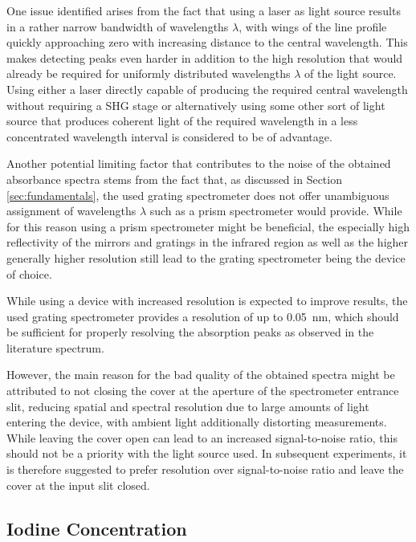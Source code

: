 One issue identified arises from the fact that using a laser as light source results in a rather narrow bandwidth of wavelengths $\lambda$, with wings of the line profile quickly approaching zero with increasing distance to the central wavelength. This makes detecting peaks even harder in addition to the high resolution that would already be required for uniformly distributed wavelengths $\lambda$ of the light source. Using either a laser directly capable of producing the required central wavelength without requiring a SHG stage or alternatively using some other sort of light source that produces coherent light of the required wavelength in a less concentrated wavelength interval is considered to be of advantage.

Another potential limiting factor that contributes to the noise of the obtained absorbance spectra stems from the fact that, as discussed in Section \ref{sec:fundamentals}, the used grating spectrometer does not offer unambiguous assignment of wavelengths $\lambda$ such as a prism spectrometer would provide. While for this reason using a prism spectrometer might be beneficial, the especially high reflectivity of the mirrors and gratings in the infrared region as well as the higher generally higher resolution still lead to the grating spectrometer being the device of choice.

While using a device with increased resolution is expected to improve results, the used grating spectrometer provides a resolution of up to \SI{0.05}{\nm}, which should be sufficient for properly resolving the absorption peaks as observed in the literature spectrum.

However, the main reason for the bad quality of the obtained spectra might be attributed to not closing the cover at the aperture of the spectrometer entrance slit, reducing spatial and spectral resolution due to large amounts of light entering the device, with ambient light additionally distorting measurements. While leaving the cover open can lead to an increased signal-to-noise ratio, this should not be a priority with the light source used. In subsequent experiments, it is therefore suggested to prefer resolution over signal-to-noise ratio and leave the cover at the input slit closed.

\subsection{Iodine Concentration}
\label{sec:discussion:iodine-concentration}

